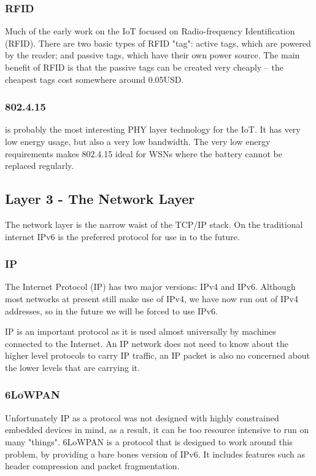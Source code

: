 \documentclass[11pt,journal,compsoc]{IEEEtran}
\begin{document}
\subsubsection{RFID}
Much of the early work on the IoT focused on Radio-frequency Identification
(RFID). There are two basic types of RFID "tag": active tags, which are powered
by the reader; and passive tags, which have their own power source. The main
benefit of RFID is that the passive tags can be created very cheaply -- the
cheapest tags cost somewhere around 0.05USD. 

\subsubsection{802.4.15}
is probably the most interesting PHY layer technology for the IoT. It has very
low energy usage, but also a very low bandwidth. The very low energy
requirements makes 802.4.15 ideal for WSNs where the battery cannot be replaced
regularly. 


\subsection{Layer 3 - The Network Layer}
The network layer is the narrow waist of the TCP/IP stack. On the traditional
internet IPv6 is the preferred protocol for use in to the future.

\subsubsection{IP}
The Internet Protocol (IP) has two major versions: IPv4 and IPv6. Although most
networks at present still make use of IPv4, we have now run out of IPv4
addresses, so in the future we will be forced to use IPv6.

IP is an important protocol as it is used almost universally by machines
connected to the Internet. An IP network does not need to know about the higher
level protocols to carry IP traffic, an IP packet is also no concerned about
the lower levels that are carrying it. 

\subsubsection{6LoWPAN}
Unfortunately IP as a protocol was not designed with highly constrained
embedded devices in mind, as a result, it can be too resource intensive to run
on many "things". 6LoWPAN is a protocol that is designed to work around this
problem, by providing a bare bones version of IPv6. It includes features such
as header compression and packet fragmentation.  
\end{document}
